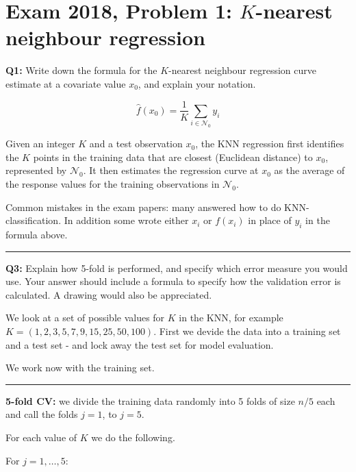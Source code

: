 \documentclass[]{article}
\begin{document}
\section{\texorpdfstring{Exam 2018, Problem 1: \(K\)-nearest neighbour
regression}{Exam 2018, Problem 1: K-nearest neighbour regression}}\label{exam-2018-problem-1-k-nearest-neighbour-regression}

\textbf{Q1:} Write down the formula for the \(K\)-nearest neighbour
regression curve estimate at a covariate value \(x_0\), and explain your
notation.

\[\hat{f}(x_0)=\frac{1}{K}\sum_{i\in \mathcal{N}_0} y_i\]

Given an integer \(K\) and a test observation \(x_0\), the KNN
regression first identifies the \(K\) points in the training data that
are closest (Euclidean distance) to \(x_0\), represented by
\(\mathcal{N}_0\). It then estimates the regression curve at \(x_0\) as
the average of the response values for the training observations in
\(\mathcal{N}_0\).

Common mistakes in the exam papers: many answered how to do
KNN-classification. In addition some wrote either \(x_i\) or \(f(x_i)\)
in place of \(y_i\) in the formula above.

\begin{center}\rule{0.5\linewidth}{\linethickness}\end{center}

\textbf{Q3:} Explain how 5-fold is performed, and specify which error
measure you would use. Your answer should include a formula to specify
how the validation error is calculated. A drawing would also be
appreciated.

We look at a set of possible values for \(K\) in the KNN, for example
\(K=(1,2,3,5,7,9,15,25,50,100)\). First we devide the data into a
training set and a test set - and lock away the test set for model
evaluation.

We work now with the training set.

\begin{center}\rule{0.5\linewidth}{\linethickness}\end{center}

\textbf{5-fold CV:} we divide the training data randomly into 5 folds of
size \(n/5\) each and call the folds \(j=1\), to \(j=5\).

For each value of \(K\) we do the following.

For \(j=1,\ldots,5\):
\end{document}

